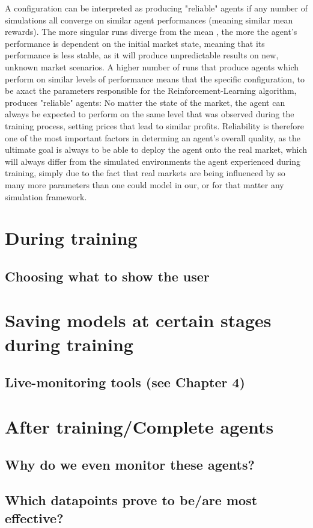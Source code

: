  A configuration can be interpreted as producing "reliable" agents if any number of simulations all converge on similar agent performances (meaning similar mean rewards). The more singular runs diverge from the mean , the more the agent's performance is dependent on the initial market state, meaning that its performance is less stable, as it will produce unpredictable results on new, unknown market scenarios. A higher number of runs that produce agents which perform on similar levels of performance means that the specific configuration, to be axact the parameters responsible for the Reinforcement-Learning algorithm, produces "reliable" agents: No matter the state of the market, the agent can always be expected to perform on the same level that was observed during the training process, setting prices that lead to similar profits. Reliability is therefore one of the most important factors in determing an agent's overall quality, as the ultimate goal is always to be able to deploy the agent onto the real market, which will always differ from the simulated environments the agent experienced during training, simply due to the fact that real markets are being influenced by so many more parameters than one could model in our, or for that matter any simulation framework. 

\section{During training}
\subsection{Choosing what to show the user}
\section{Saving models at certain stages during training}
\subsection{Live-monitoring tools (see Chapter 4)}

\section{After training/Complete agents}
\subsection{Why do we even monitor these agents?}
\subsection{Which datapoints prove to be/are most effective?}